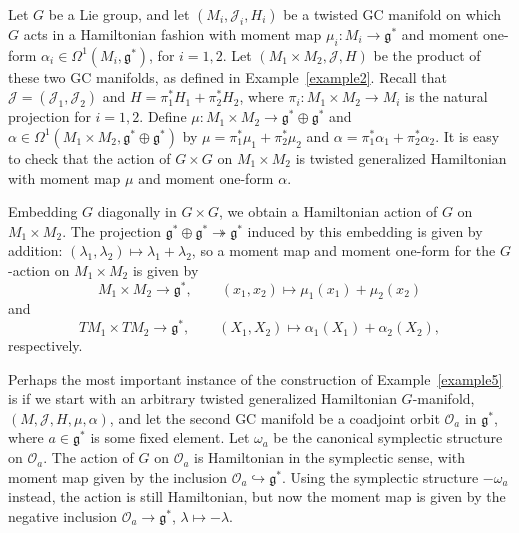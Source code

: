 \documentclass[11pt]{article}
\numberwithin{equation}{section}
\newcommand{\func}[3]{#1 \colon #2 \to #3}
\newcommand{\tang}{T}
\begin{document}
\begin{Example} \label{example5}
Let $G$ be a Lie group, and let $(M_i,\mathcal{J}_i,H_i)$ be a twisted GC manifold on which $G$ acts in a Hamiltonian fashion with moment map $\func{\mu_i}{M_i}{\mathfrak{g}^*}$ and moment one-form $\alpha_i \in \Omega^1(M_i,\mathfrak{g}^*)$, for $i=1,2$.  Let $(M_1 \times M_2, \mathcal{J}, H)$ be the product of these two GC manifolds, as def\/ined in Example~\ref{example2}.  Recall that $\mathcal{J} = (\mathcal{J}_1,\mathcal{J}_2)$ and $H = \pi_1^* H_1 + \pi_2^* H_2$, where $\func{\pi_i}{M_1 \times M_2}{M_i}$ is the natural projection for $i=1,2$.  Def\/ine $\func{\mu}{M_1 \times M_2}{\mathfrak{g}^* \oplus \mathfrak{g}^*}$ and $\alpha \in \Omega^1(M_1 \times M_2, \mathfrak{g}^* \oplus \mathfrak{g}^*)$ by $\mu = \pi_1^* \mu_1 + \pi_2^* \mu_2$ and $\alpha = \pi_1^* \alpha_1 + \pi_2^* \alpha_2$.  It is easy to check that the action of $G \times G$ on $M_1 \times M_2$ is twisted generalized Hamiltonian with moment map $\mu$ and moment one-form $\alpha$.

Embedding $G$ diagonally in $G \times G$, we obtain a Hamiltonian action of $G$ on $M_1 \times M_2$.  The projection $\mathfrak{g}^* \oplus \mathfrak{g}^* \twoheadrightarrow \mathfrak{g}^*$ induced by this embedding is given by addition: $(\lambda_1, \lambda_2) \mapsto \lambda_1 + \lambda_2$, so a moment map and moment one-form for the $G$-action on $M_1 \times M_2$ is given by
\[
  M_1 \times M_2 \to \mathfrak{g}^*,
  \qquad
  (x_1,x_2) \mapsto \mu_1(x_1) + \mu_2(x_2)
\]
and
\[
  \tang M_1 \times \tang M_2
  \to \mathfrak{g}^*,
  \qquad
  (X_1,X_2) \mapsto \alpha_1(X_1) + \alpha_2(X_2),
\]
respectively.
\end{Example}


Perhaps the most important instance of the construction of Example~\ref{example5} is if we start with an arbitrary twisted generalized Hamiltonian $G$-manifold, $(M,\mathcal{J},H,\mu,\alpha)$, and let the second GC manifold be a coadjoint orbit $\mathcal{O}_{a}$ in $\mathfrak{g}^*$, where $a \in \mathfrak{g}^*$ is some f\/ixed element.  Let $\omega_{a}$ be the canonical symplectic structure on $\mathcal{O}_{a}$.  The action of $G$ on $\mathcal{O}_{a}$ is Hamiltonian in the symplectic sense, with moment map given by the inclusion $\mathcal{O}_{a} \hookrightarrow \mathfrak{g}^*$.  Using the symplectic structure $-\omega_{a}$ instead, the action is still Hamiltonian, but now the moment map is given by the negative inclusion $\mathcal{O}_{a} \to \mathfrak{g}^*$, $\lambda \mapsto -\lambda$.
\end{document}
